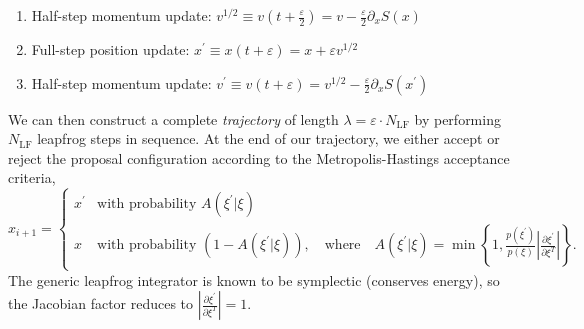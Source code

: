 \documentclass{article} %
\begin{document}
\begin{enumerate}
   \item Half-step momentum update: \hspace{12pt}\(%
      v^{1/2} \equiv v{\left(t+\frac{\varepsilon}{2}\right)} = v-\frac{\varepsilon}{2}\partial_{x}S(x)
   \)
   \item Full-step position update: \hspace{36pt}\(%
      x^{\prime} \equiv x(t+\varepsilon) = x + \varepsilon v^{1/2}
   \)
   \item Half-step momentum update:
      \hspace{18pt} \(%
         v^{\prime} \equiv v(t+\varepsilon) = v^{1/2} - \frac{\varepsilon}{2}\partial_{x} S(x^{\prime})
   \)
\end{enumerate}
%
We can then construct a complete \emph{trajectory} of length \(\lambda = \varepsilon\cdot N_{\mathrm{LF}}\) by
performing \(N_{\mathrm{LF}}\) leapfrog steps in sequence.
%
At the end of our trajectory, we either accept or reject the proposal configuration according to the Metropolis-Hastings
acceptance criteria,
%
\begin{equation}
   x_{i+1} =
   \begin{cases}%
      x^{\prime} &\mbox{with probability } A(\xi^{\prime}|\xi) \\
      x &\mbox{with probability } (1 - A(\xi^{\prime}|\xi)), \quad\text{where}\quad %
         A(\xi^{\prime}|\xi) = \min\left\{%
            1, \frac{p(\xi^{\prime})}{p(\xi)}\left|\frac{\partial{\xi^{\prime}}}{\partial\xi^{T}}\right|%
         \right\}.
   \end{cases}
   \label{eq:mhcriteria}
\end{equation}
%
%
The generic leapfrog integrator is known to be symplectic (conserves energy), so the Jacobian factor reduces to
\(\left|\frac{\partial\xi^{\prime}}{\partial\xi^{T}}\right| = 1\). 
%
\end{document}
